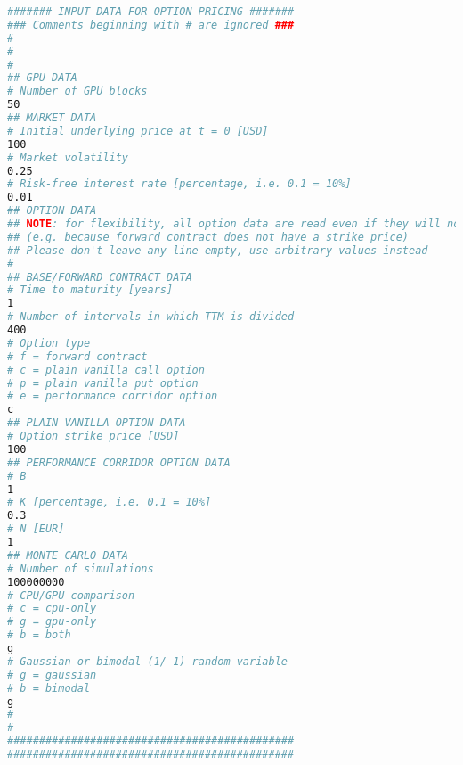 \begin{lstlisting}[language=bash, caption={\texttt{input.dat}}]
####### INPUT DATA FOR OPTION PRICING #######
### Comments beginning with # are ignored ###
#
#
#
## GPU DATA
# Number of GPU blocks
50
## MARKET DATA
# Initial underlying price at t = 0 [USD]
100
# Market volatility
0.25
# Risk-free interest rate [percentage, i.e. 0.1 = 10%]
0.01
## OPTION DATA
## NOTE: for flexibility, all option data are read even if they will not be used
## (e.g. because forward contract does not have a strike price)
## Please don't leave any line empty, use arbitrary values instead
#
## BASE/FORWARD CONTRACT DATA
# Time to maturity [years]
1
# Number of intervals in which TTM is divided
400
# Option type
# f = forward contract
# c = plain vanilla call option
# p = plain vanilla put option
# e = performance corridor option
c
## PLAIN VANILLA OPTION DATA
# Option strike price [USD]
100
## PERFORMANCE CORRIDOR OPTION DATA
# B
1
# K [percentage, i.e. 0.1 = 10%]
0.3
# N [EUR]
1
## MONTE CARLO DATA
# Number of simulations
100000000
# CPU/GPU comparison
# c = cpu-only
# g = gpu-only
# b = both
g
# Gaussian or bimodal (1/-1) random variable
# g = gaussian
# b = bimodal
g
#
#
#############################################
#############################################
\end{lstlisting}